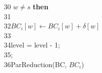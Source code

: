 \begin{flushleft}
\begin{algorithm}
	30\hspace*{2pc}{\bf if} $w\neq s$ {\bf then}\\
	31\hspace*{3pc}{\it lock;}\\
	32\hspace*{3pc}$BC_{i}[w]\leftarrow BC_{i}[w]+\delta[w]$\\
	33\hspace*{3pc}{\it unlock;}\\
	34\hspace*{2pc}level = level - 1;\\
	35\hspace*{2pc}{\bf sync};\\
	36\hspace*{1pc}ParReduction(BC, $BC_{i}$)
\end{algorithm}


\end{flushleft}
